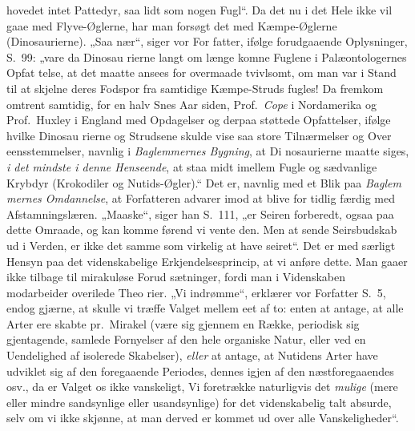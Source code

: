 \documentclass[12pt,a4paper]{article}
\newcommand{\opage}[1]{\marginnote{\footnotesize\textit{[#1]}}}
\begin{document}
hovedet intet Pattedyr, saa lidt som nogen Fugl“. Da det nu i
det Hele ikke vil gaae med Flyve-Øglerne, har man forsøgt det
med Kæmpe-Øglerne (Dinosaurierne). „Saa nær“, siger vor For\-%
fatter, ifølge forudgaaende Oplysninger, S.\ 99: „vare da Dinosau\-%
rierne langt om længe komne Fuglene i Palæontologernes Opfat\-%
\opage{39}telse, at det maatte ansees for overmaade tvivlsomt, om man var
i Stand til at skjelne deres Fodspor fra samtidige Kæmpe-Struds\-%
fugles! Da fremkom omtrent samtidig, for en halv Snes Aar
siden, Prof.\ \emph{Cope} i Nordamerika og Prof.\ Huxley i England med
Opdagelser og derpaa støttede Opfattelser, ifølge hvilke Dinosau\-%
rierne og Strudsene skulde vise saa store Tilnærmelser og Over\-%
eensstemmelser, navnlig i \emph{Baglemmernes Bygning}, at Di\-%
nosaurierne maatte siges, \emph{i det mindste i denne Henseende},
at staa midt imellem Fugle og sædvanlige Krybdyr (Krokodiler
og Nutids-Øgler).“ Det er, navnlig med et Blik paa \emph{Baglem\-%
mernes Omdannelse}, at Forfatteren advarer imod at blive
for tidlig færdig med Afstamningslæren. „Maaske“, siger han
S.\ 111, „er Seiren forberedt, ogsaa paa dette Omraade, og kan
komme førend vi vente den. Men at sende Seirsbudskab ud i
Verden, er ikke det samme som virkelig at have seiret“. Det er
med særligt Hensyn paa det videnskabelige Erkjendelsesprincip, at
vi anføre dette. Man gaaer ikke tilbage til mirakuløse Forud\-%
sætninger, fordi man i Videnskaben modarbeider overilede Theo\-%
rier. „Vi indrømme“, erklærer vor Forfatter S.\ 5, endog gjærne,
at skulle vi træffe Valget mellem eet af to: enten at antage, at
alle Arter ere skabte pr.\ Mirakel (være sig gjennem en Række,
periodisk sig gjentagende, samlede Fornyelser af den hele organiske
Natur, eller ved en Uendelighed af isolerede Skabelser), \emph{eller} at
antage, at Nutidens Arter have udviklet sig af den foregaaende
Periodes, dennes igjen af den næstforegaaendes osv., da er Valget os
ikke vanskeligt, Vi foretrække naturligvis det \emph{mulige} (mere
eller mindre sandsynlige eller usandsynlige) for det videnskabelig
talt absurde, selv om vi ikke skjønne, at man derved er kommet
ud over alle Vanskeligheder“.
\end{document}
